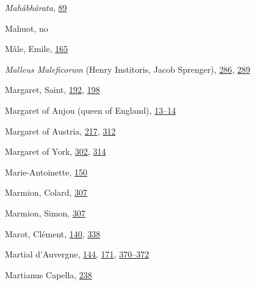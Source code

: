 \emph{Mahâbhârata},
\protect\hyperlink{10_Chapter_Three__THE_HEROIC_DREAM.xhtmlux5cux23page_89}{89}

Mahuot, no

Mâle, Emile,
\protect\hyperlink{12_Chapter_Five__THE_VISION_OF_DEAT.xhtmlux5cux23page_165}{165}

\emph{Malleus Maleficorum} (Henry Institoris, Jacob Sprenger),
\protect\hyperlink{18_Chapter_Eleven__THE_FORMS_OF_THO.xhtmlux5cux23page_286}{286},
\protect\hyperlink{18_Chapter_Eleven__THE_FORMS_OF_THO.xhtmlux5cux23page_289}{289}

Margaret, Saint,
\protect\hyperlink{13_Chapter_Six__THE_DEPICTION_OF_TH.xhtmlux5cux23page_192}{192},
\protect\hyperlink{13_Chapter_Six__THE_DEPICTION_OF_TH.xhtmlux5cux23page_198}{198}

Margaret of Anjou (queen of England),
\protect\hyperlink{08_Chapter_One__THE_PASSIONATE_INTE.xhtmlux5cux23page_13}{13--}\protect\hyperlink{08_Chapter_One__THE_PASSIONATE_INTE.xhtmlux5cux23page_14}{14}

Margaret of Austria,
\protect\hyperlink{14_Chapter_Seven__THE_PIOUS_PERSONA.xhtmlux5cux23page_217}{217},
\protect\hyperlink{20_ILLUSTRATIONS_FOLLOW_PAGE.xhtmlux5cux23page_312}{312}

Margaret of York,
\protect\hyperlink{20_ILLUSTRATIONS_FOLLOW_PAGE.xhtmlux5cux23page_302}{302},
\protect\hyperlink{20_ILLUSTRATIONS_FOLLOW_PAGE.xhtmlux5cux23page_314}{314}

Marie-Antoinette,
\protect\hyperlink{11_Chapter_Four__THE_FORMS_OF_LOVE.xhtmlux5cux23page_150}{150}

Marmion, Colard,
\protect\hyperlink{20_ILLUSTRATIONS_FOLLOW_PAGE.xhtmlux5cux23page_307}{307}

Marmion, Simon,
\protect\hyperlink{20_ILLUSTRATIONS_FOLLOW_PAGE.xhtmlux5cux23page_307}{307}

Marot, Clément,
\protect\hyperlink{11_Chapter_Four__THE_FORMS_OF_LOVE.xhtmlux5cux23page_140}{140},
\protect\hyperlink{21_Chapter_Thirteen__IMAGE_AND_WORD.xhtmlux5cux23page_338}{338}

Martial d'Auvergne,
\protect\hyperlink{11_Chapter_Four__THE_FORMS_OF_LOVE.xhtmlux5cux23page_144}{144},
\protect\hyperlink{12_Chapter_Five__THE_VISION_OF_DEAT.xhtmlux5cux23page_171}{171},
\protect\hyperlink{21_Chapter_Thirteen__IMAGE_AND_WORD.xhtmlux5cux23page_370}{370--}\protect\hyperlink{21_Chapter_Thirteen__IMAGE_AND_WORD.xhtmlux5cux23page_372}{372}

Martianus Capella,
\protect\hyperlink{16_Chapter_Nine__THE_DECLINE_OF_SYM.xhtmlux5cux23page_238}{238}

